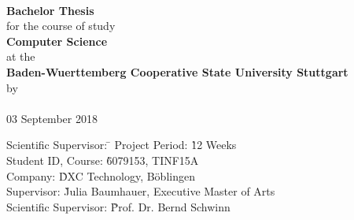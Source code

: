 \begin{titlepage}

\begin{minipage}{\textwidth}
		\vspace{-2cm}
		\noindent
		\hfill
\end{minipage}

\enlargethispage{20mm}

\sffamily
\begin{center}
    \vspace*{24mm}  {\large\textbf{\dertitel}}       \\
    \vspace*{12mm}  {\large\textbf{Bachelor Thesis}}        \\
    \vspace*{24mm}   for the course of study         \\
    \vspace*{3mm}   {\large\textbf{Computer Science}} \\
    \vspace*{3mm}   at the                         \\
    \vspace*{3mm}   {\large\textbf{Baden-Wuerttemberg Cooperative State University Stuttgart}}  \\
    \vspace*{12mm}  by                              \\
    \vspace*{3mm}   {\large\textbf{\derautor}}      \\
    \vspace*{12mm}  03 September 2018 \\

\vfill

\begin{minipage}{\textwidth}

\begin{tabbing}
	Scientific Supervisor: \hspace{1.85cm} \= \kill
	Project Period: \` 12 Weeks \\[1.5mm]
	Student ID, Course: \` 6079153, TINF15A\\[1.5mm]
	Company: \` DXC Technology, Böblingen\\[1.5mm]
	Supervisor: \` Julia Baumhauer, Executive Master of Arts\\[1.5mm]
	Scientific Supervisor: \` Prof. Dr. Bernd Schwinn \\[1.5mm]

\end{tabbing}
\end{minipage}

\end{center}

\end{titlepage}
